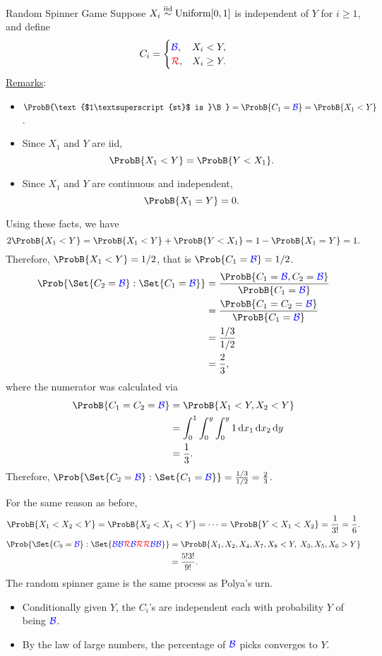 \begin{Example}{Random Spinner Game}{}
    Suppose $ X_i \overset{\text{iid}}{\sim}\text{Uniform}[0,1] $
    is independent of $ Y $ for $ i\ge 1 $, and define
    \[ C_i=\begin{cases}
            \textcolor{blue}{\mathcal{B}}, & X_i<Y,    \\
            \textcolor{red}{\mathcal{R}}, & X_i\ge Y.
        \end{cases} \]
    \underline{Remarks}:
    \begin{itemize}
        \item $ \ProbB{\text{$1\textsuperscript{st}$ is }\B}=
                  \ProbB{C_1=\B}=\ProbB{X_1<Y} $.
        \item Since $ X_1 $ and $ Y $ are iid,
              \[ \ProbB{X_1<Y}=\ProbB{Y<X_1}. \]
        \item Since $ X_1 $ and $ Y $ are continuous and independent,
              \[ \ProbB{X_1=Y}=0. \]
    \end{itemize}
    Using these facts, we have
    \[ 2\ProbB{X_1<Y}=\ProbB{X_1<Y}+\ProbB{Y<X_1}=1-\ProbB{X_1=Y}=1. \]
    Therefore, $ \ProbB{X_1<Y}=1/2 $, that is $ \Prob{C_1=\B}=1/2 $.
    \begin{align*}
        \Prob{\Set{C_2=\B}\given \Set{C_1=\B}}
         & =\frac{\ProbB{C_1=\B,C_2=\B}}{\ProbB{C_1=\B}} \\
         & =\frac{\ProbB{C_1=C_2=\B}}{\ProbB{C_1=\B}}    \\
         & =\frac{1/3}{1/2}                              \\
         & =\frac{2}{3},
    \end{align*}
    where the numerator was calculated via
    \begin{align*}
        \ProbB{C_1=C_2=\B}
         & =\ProbB{X_1<Y,X_2<Y}                                               \\
         & =\int_{0}^{1}\int_{0}^{y}\int_{0}^{y}1\odif{x_1}\odif{x_2}\odif{y} \\
         & =\frac{1}{3}.
    \end{align*}
    Therefore, $ \Prob{\Set{C_2=\B}\given \Set{C_1=\B}}=\frac{1/3}{1/2}=\frac{2}{3} $.

    For the same reason as before,
    \[
        \ProbB{X_1<X_2<Y}=\ProbB{X_2<X_1<Y}=\cdots=\ProbB{Y<X_1<X_2}=\frac{1}{3!}=\frac{1}{6}.
    \]
    \begin{align*}
        \Prob{\Set{C_9=\B}\given \Set{\B\B\R\B\R\R\B\B}}
         & =\ProbB{X_1,X_2,X_4,X_7,X_8<Y,\; X_3,X_5,X_6>Y} \\
         & =\frac{5!3!}{9!}.
    \end{align*}
    The random spinner game is the same process as Polya's urn.

    \begin{itemize}
        \item Conditionally given $ Y $, the $ C_i $'s are
              independent each with probability $ Y $ of being $ \textcolor{blue}{\mathcal{B}} $.
        \item By the law of large numbers, the percentage of
              $ \textcolor{blue}{\mathcal{B}} $ picks converges to $ Y $.
    \end{itemize}
\end{Example}
